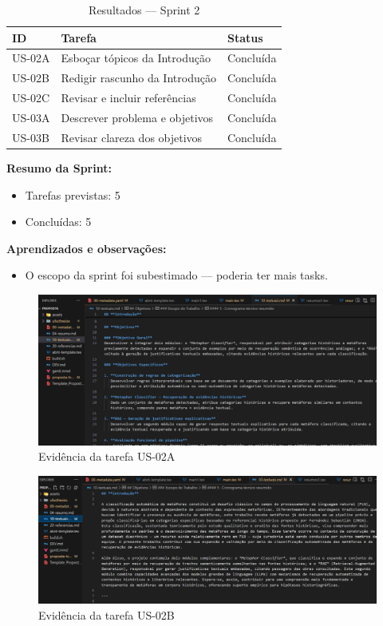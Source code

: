 \begin{table}[htbp]
  \centering
  \caption{Resultados — Sprint 2}
  \label{tab:resultSprint2}
  \begin{tabular}{lll}
    \toprule
    ID & Tarefa & Status \\
    \midrule
    US-02A & Esboçar tópicos da Introdução & Concluída \\
    US-02B & Redigir rascunho da Introdução & Concluída \\
    US-02C & Revisar e incluir referências & Concluída \\
    US-03A & Descrever problema e objetivos & Concluída \\
    US-03B & Revisar clareza dos objetivos & Concluída \\
    \bottomrule
  \end{tabular}
\end{table}

\vspace{1em}
\noindent\textbf{Resumo da Sprint:}
\begin{itemize}[noitemsep]
  \item Tarefas previstas: 5
  \item Concluídas: 5
\end{itemize}

\noindent\textbf{Aprendizados e observações:}
\begin{itemize}
  \item O escopo da sprint foi subestimado — poderia ter mais tasks.
\end{itemize}

\begin{figure}[htbp]
  \centering
  \includegraphics[width=0.6\linewidth]{pictures/intro_topicos.png}
  \caption{Evidência da tarefa US-02A}
\end{figure}

\begin{figure}[htbp]
  \centering
  \includegraphics[width=0.6\linewidth]{pictures/intro_rascunho.png}
  \caption{Evidência da tarefa US-02B}
\end{figure}

